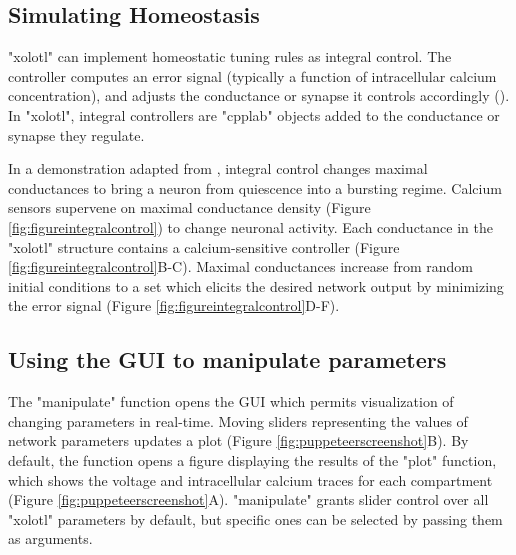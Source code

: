 \documentclass{frontiersSCNS} %
\begin{document}
\subsection{Simulating Homeostasis}

"xolotl" can implement homeostatic tuning rules as integral control. The controller computes an error signal (typically a function of intracellular calcium concentration), and adjusts the conductance or synapse it controls accordingly (\cite{olearyCorrelationsIonChannel2013}). In "xolotl", integral controllers are "cpplab" objects added to the conductance or synapse they regulate.

In a demonstration adapted from \cite{olearyCorrelationsIonChannel2013}, integral control changes maximal conductances to bring a neuron from quiescence into a bursting regime. Calcium sensors supervene on maximal conductance density (Figure \ref{fig:figureintegralcontrol}) to change neuronal activity. Each conductance in the "xolotl" structure contains a calcium-sensitive controller (Figure \ref{fig:figureintegralcontrol}B-C). Maximal conductances increase from random initial conditions to a set which elicits the desired network output by minimizing the error signal (Figure \ref{fig:figureintegralcontrol}D-F).

%
%
%
%
%
%

\subsection{Using the GUI to manipulate parameters}

The "manipulate" function opens the GUI which permits visualization of changing parameters in real-time. Moving sliders representing the values of network parameters updates a plot (Figure \ref{fig:puppeteerscreenshot}B). By default, the function opens a figure displaying the results of the "plot" function, which shows the voltage and intracellular calcium traces for each compartment (Figure \ref{fig:puppeteerscreenshot}A). "manipulate" grants slider control over all "xolotl" parameters by default, but specific ones can be selected by passing them as arguments.

%
%
%
%
%
%
\end{document}
